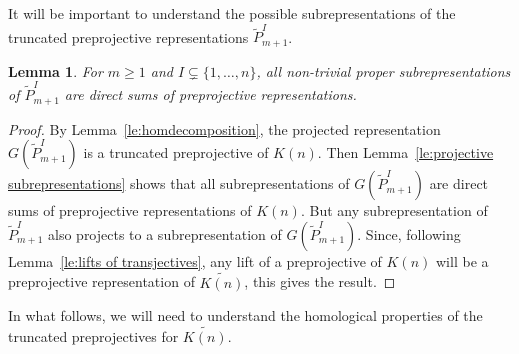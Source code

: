 \documentclass{amsart}
\newtheorem{lemma}[theorem]{Lemma}
\numberwithin{equation}{section}
\begin{document}
It will be important to understand the possible subrepresentations of the truncated preprojective representations $\tilde P_{m+1}^I$.

\begin{lemma}
  \label{le:subrep}
  For $m\ge1$ and $I\subsetneq\{1,\ldots,n\}$, all non-trivial proper subrepresentations of $\tilde P_{m+1}^I$ are direct sums of preprojective representations.	
\end{lemma}
\begin{proof}
  By Lemma~\ref{le:homdecomposition}, the projected representation $G(\tilde P_{m+1}^I)$ is a truncated preprojective of $K(n)$.
  Then Lemma~\ref{le:projective subrepresentations} shows that all subrepresentations of $G(\tilde P_{m+1}^I)$ are direct sums of preprojective representations of $K(n)$.
  But any subrepresentation of $\tilde P_{m+1}^I$ also projects to a subrepresentation of $G(\tilde P_{m+1}^I)$.
  Since, following Lemma~\ref{le:lifts of transjectives}, any lift of a preprojective of $K(n)$ will be a preprojective representation of $\widetilde{K(n)}$, this gives the result.
\end{proof}

In what follows, we will need to understand the homological properties of the truncated preprojectives for $\widetilde{K(n)}$.
\end{document}
